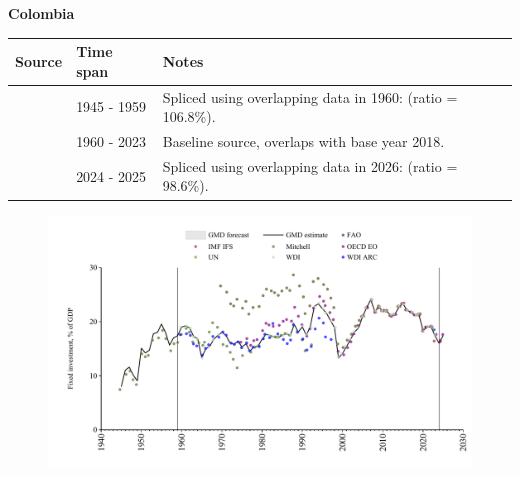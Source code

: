 \documentclass[12pt,a4paper,landscape]{article}
\begin{document}
\begin{adjustbox}{max totalsize={\paperwidth}{\paperheight},center}
\begin{minipage}[t][\textheight][t]{\textwidth}
\vspace*{0.5cm}
{}
\begin{center}
{\Large\bfseries Colombia}
\end{center}
\vspace{0.5cm}
\begin{table}[H]
\centering
\small
\begin{tabular}{|l|l|l|}
\hline
\textbf{Source} & \textbf{Time span} & \textbf{Notes} \\
\hline
\rowcolor{white}\cite{Mitchell}& 1945 - 1959 &Spliced using overlapping data in 1960: (ratio = 106.8\%).\\
\rowcolor{lightgray}\cite{WDI}& 1960 - 2023 &Baseline source, overlaps with base year 2018.\\
\rowcolor{white}\cite{OECD_EO}& 2024 - 2025 &Spliced using overlapping data in 2026: (ratio = 98.6\%).\\
\hline
\end{tabular}
\end{table}
\begin{figure}[H]
\centering
\includegraphics[width=\textwidth,height=0.6\textheight,keepaspectratio]{graphs/COL_finv_GDP.pdf}
\end{figure}
\end{minipage}
\end{adjustbox}
\end{document}
